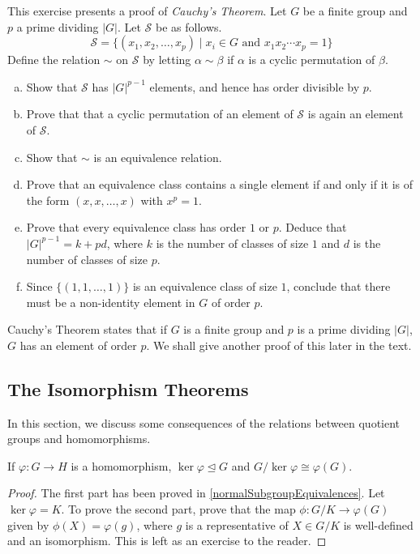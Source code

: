 \begin{exercise}
\label{exercCauchyThm}
    This exercise presents a proof of \textit{Cauchy's Theorem}. Let $G$ be a finite group and $p$ a prime dividing $|G|$. Let $\mathcal{S}$ be as follows.
    $$\mathcal{S}=\{(x_1,x_2,\ldots,x_p)\mid x_i\in G\text{ and } x_1x_2\cdots x_p=1\}$$
    Define the relation $\sim$ on $\mathcal{S}$ by letting $\alpha\sim\beta$ if $\alpha$ is a cyclic permutation of $\beta$.
    \begin{enumerate}[(a)]
        \item Show that $\mathcal{S}$ has $|G|^{p-1}$ elements, and hence has order divisible by $p$.
        \item Prove that that a cyclic permutation of an element of $\mathcal{S}$ is again an element of $\mathcal{S}$.
        \item Show that $\sim$ is an equivalence relation.
        \item Prove that an equivalence class contains a single element if and only if it is of the form $(x,x,\ldots,x)$ with $x^p=1$.
        \item Prove that every equivalence class has order $1$ or $p$. Deduce that $|G|^{p-1}=k+pd$, where $k$ is the number of classes of size $1$ and $d$ is the number of classes of size $p$.
        \item Since $\{(1,1,\ldots,1)\}$ is an equivalence class of size $1$, conclude that there must be a non-identity element in $G$ of order $p$.
    \end{enumerate}
    
    Cauchy's Theorem states that if $G$ is a finite group and $p$ is a prime dividing $|G|$, $G$ has an element of order $p$. We shall give another proof of this later in the text.
\end{exercise}

\subsection{The Isomorphism Theorems}

In this section, we discuss some consequences of the relations between quotient groups and homomorphisms.

\begin{theorem}
\label{FirstIsoTheorem}
    If $\varphi:G\to H$ is a homomorphism, $\ker\varphi\unlhd G$ and $G/\ker\varphi\cong\varphi(G)$.
\end{theorem}
\begin{proof}
    The first part has been proved in \ref{normalSubgroupEquivalences}. Let $\ker\varphi=K$. To prove the second part, prove that the map $\phi:G/K\to\varphi(G)$ given by $\phi(X)=\varphi(g)$, where $g$ is a representative of $X\in G/K$ is well-defined and an isomorphism. This is left as an exercise to the reader.
\end{proof}

